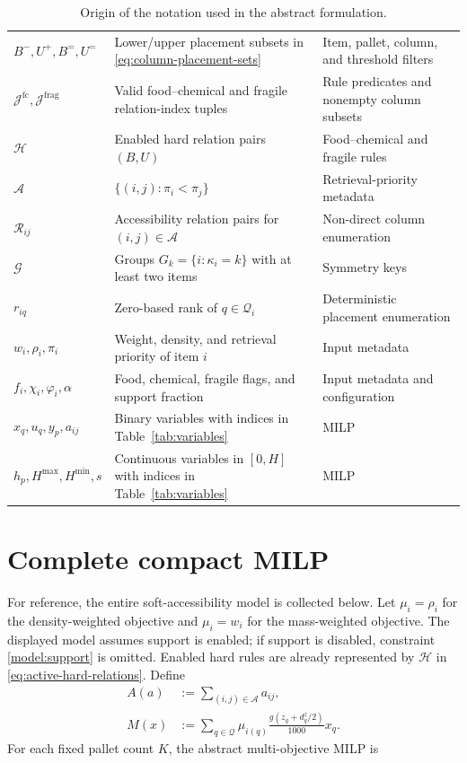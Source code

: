 \documentclass[11pt]{article}
\newcommand{\Place}{\mathcal{Q}}
\newcommand{\Prio}{\pi}
\begin{document}
\begin{table}[ht]
\begin{tabularx}{\linewidth}{@{}lXX@{}}
$B^-,U^+,B^=,U^=$ & Lower/upper placement subsets in \eqref{eq:column-placement-sets} & Item, pallet, column, and threshold filters \\
$\mathcal J^{\mathrm{fc}},\mathcal J^{\mathrm{frag}}$ & Valid food--chemical and fragile relation-index tuples & Rule predicates and nonempty column subsets \\
$\mathcal H$ & Enabled hard relation pairs $(B,U)$ & Food--chemical and fragile rules \\
$\mathcal A$ & $\{(i,j):\Prio_i<\Prio_j\}$ & Retrieval-priority metadata \\
$\mathcal R_{ij}$ & Accessibility relation pairs for $(i,j)\in\mathcal A$ & Non-direct column enumeration \\
$\mathcal G$ & Groups $G_k=\{i:\kappa_i=k\}$ with at least two items & Symmetry keys \\
$r_{iq}$ & Zero-based rank of $q\in\Place_i$ & Deterministic placement enumeration \\
$w_i,\rho_i,\Prio_i$ & Weight, density, and retrieval priority of item $i$ & Input metadata \\
$f_i,\chi_i,\varphi_i,\alpha$ & Food, chemical, fragile flags, and support fraction & Input metadata and configuration \\
$x_q,u_q,y_p,a_{ij}$ & Binary variables with indices in Table~\ref{tab:variables} & MILP \\
$h_p,H^{\max},H^{\min},s$ & Continuous variables in $[0,H]$ with indices in Table~\ref{tab:variables} & MILP \\
\bottomrule
\end{tabularx}
\caption{Origin of the notation used in the abstract formulation.}
\label{tab:symbol-origins}
\end{table}

\clearpage
\section{Complete compact MILP}

For reference, the entire soft-accessibility model is collected below.  Let
$\mu_i=\rho_i$ for the density-weighted objective and $\mu_i=w_i$ for the
mass-weighted objective.  The displayed model assumes support is enabled; if
support is disabled, constraint \eqref{model:support} is omitted.  Enabled
hard rules are already represented by $\mathcal H$ in
\eqref{eq:active-hard-relations}.  Define
\begin{align}
  A(a) &:= \sum_{(i,j)\in\mathcal{A}} a_{ij},
  \label{eq:complete-A}\\
  M(x) &:= \sum_{q\in\Place}
  \mu_{i(q)}\frac{g(z_q+d_q^z/2)}{1000}x_q.
  \label{eq:complete-M}
\end{align}
For each fixed pallet count $K$, the abstract multi-objective MILP is
\end{document}
